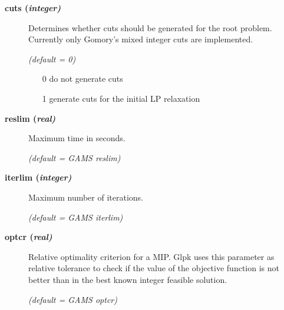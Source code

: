\begin{description}
\item[\label{glpkcuts}\hypertarget{glpkcuts}
{\textbf{cuts (\slshape{integer})}}]\hspace{1.0in}

Determines whether cuts should be generated for the root problem.
Currently only Gomory's mixed integer cuts are implemented.

\textsl{(default = 0)}
\begin{itemize}
\item[0] do not generate cuts
\item[1] generate cuts for the initial LP relaxation
\end{itemize}

\item[\label{glpkreslim}\hypertarget{glpkreslim}
{\textbf{reslim (\slshape{real})}}]\hspace{1.0in}

Maximum time in seconds.

\textsl{(default = GAMS reslim)}

\item[\label{glpkiterlim}\hypertarget{glpkiterlim}
{\textbf{iterlim (\slshape{integer})}}]\hspace{1.0in}

Maximum number of iterations.

\textsl{(default = GAMS iterlim)}

\item[\label{glpkoptcr}\hypertarget{glpkoptcr}
{\textbf{optcr (\slshape{real})}}]\hspace{1.0in}

Relative optimality criterion for a MIP.
Glpk uses this parameter as relative tolerance to check if the value of the objective function is not better than in the best known integer feasible solution.

\textsl{(default = GAMS optcr)}
\end{description}
